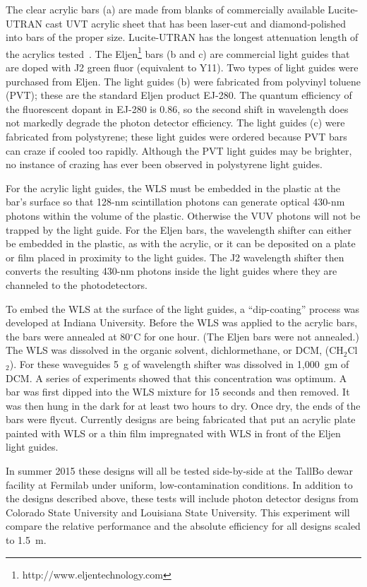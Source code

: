 The clear acrylic bars (a) are made from blanks of commercially
available Lucite-UTRAN cast UVT acrylic sheet that has been laser-cut
and diamond-polished into bars of the proper size.  Lucite-UTRAN has
the longest attenuation length of the acrylics
tested~\cite{bib:mufsonJINST}.  The
Eljen\footnote{http://www.eljentechnology.com} bars (b and c) are commercial
light guides that are doped with J2 green fluor (equivalent to Y11).
Two types of light guides were purchased from Eljen.  The light
guides (b)  were fabricated from polyvinyl toluene (PVT); these are the
standard Eljen product EJ-280.  The quantum efficiency of the
fluorescent dopant in EJ-280 is 0.86, so the second shift in
wavelength does not markedly degrade the photon detector efficiency.
The light guides (c) were fabricated from polystyrene; these light
guides were ordered because PVT bars can craze if cooled too rapidly.
Although the PVT light guides may be brighter, no instance of crazing
has ever been observed in polystyrene light guides.

For the acrylic light guides, the WLS must be embedded in the plastic
at the bar's surface so that 128-nm scintillation photons can generate
optical 430-nm photons within the volume of the plastic.  Otherwise
the VUV photons will not be trapped by the light guide.  For the Eljen
bars, the wavelength shifter can either be embedded in the plastic, as
with the acrylic, or it can be deposited on a plate or film placed in
proximity to the light guides.  The J2 wavelength shifter then
converts the resulting 430-nm photons inside the light guides where
they are channeled to the photodetectors.

To embed the WLS at the surface of the light guides, a ``dip-coating''
process was developed at Indiana University.  Before the WLS was
applied to the acrylic bars, the bars were annealed at 80$^\circ$C for one
hour.  (The Eljen bars were not annealed.)  The WLS was dissolved in the
organic solvent, dichlormethane, or DCM, (CH$_2$Cl$_2$).  For these waveguides
5~g of wavelength shifter was dissolved in 1,000~gm of DCM.  A
series of experiments showed that this concentration was optimum.  A
bar was first dipped into the WLS mixture for 15 seconds and then
removed.  It was then hung in the dark for at least two hours to dry.
Once dry, the ends of the bars were flycut.  Currently designs are
being fabricated that put an acrylic plate painted with WLS or a thin
film impregnated with WLS in front of the Eljen light guides.

In summer 2015 these designs will all be tested side-by-side at the
TallBo dewar facility at Fermilab under uniform, low-contamination
conditions.  In addition to the designs described above, these tests
will include photon detector designs from Colorado State University
and Louisiana State University.  This experiment will compare the
relative performance and the absolute efficiency for all designs
scaled to 1.5~m.

